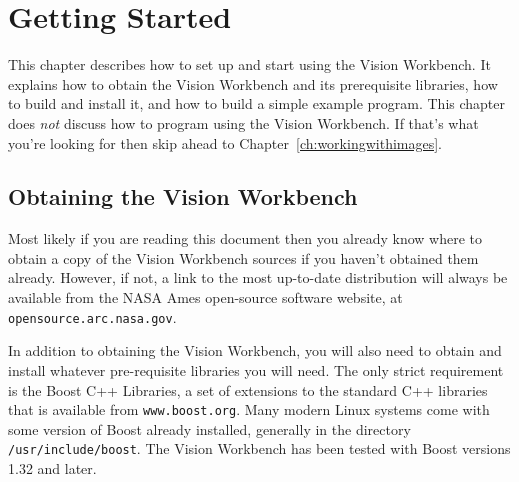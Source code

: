 \chapter{Getting Started}\label{ch:gettingstarted}

This chapter describes how to set up and start using the Vision
Workbench.  It explains how to obtain the Vision Workbench and its
prerequisite libraries, how to build and install it, and how to build
a simple example program.  This chapter does {\it not} discuss how to
program using the Vision Workbench.  If that's what you're looking for
then skip ahead to Chapter~\ref{ch:workingwithimages}.

\section{Obtaining the Vision Workbench}

Most likely if you are reading this document then you already know 
where to obtain a copy of the Vision Workbench sources if you haven't 
obtained them already.  However, if not, a link to the most up-to-date 
distribution will always be available from the NASA Ames open-source 
software website, at \verb#opensource.arc.nasa.gov#.

In addition to obtaining the Vision Workbench, you will also need to
obtain and install whatever pre-requisite libraries you will need.
The only strict requirement is the Boost C++ Libraries, a set of
extensions to the standard C++ libraries that is available from
\verb#www.boost.org#.  Many modern Linux systems come with some
version of Boost already installed, generally in the directory
\verb#/usr/include/boost#.  The Vision Workbench has been tested with
Boost versions 1.32 and later.

